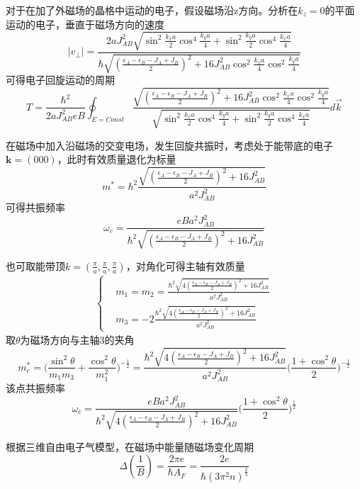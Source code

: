 \documentclass{article}
\begin{document}
对于在加了外磁场的晶格中运动的电子，假设磁场沿z方向。分析在$ k_z=0 $的平面运动的电子，垂直于磁场方向的速度
\begin{equation}
	|v_{\perp}|=\frac{2aJ_{AB}^2\sqrt{\sin^2\frac{k_xa}{2}\cos^4\frac{k_ya}{4}+\sin^2\frac{k_ya}{2}\cos^4\frac{k_xa}{4}}} {\hbar \sqrt{(\frac{\epsilon_A-\epsilon_B-J_A+J_B}{2})^2+16J_{AB}^2\cos^2\frac{k_xa}{4}\cos^2\frac{k_ya}{4}}}
\end{equation}
可得电子回旋运动的周期
\begin{equation}
	T=\frac{\hbar^2}{2aJ_{AB}^2eB}\oint_{E=Const}\dfrac{ \sqrt{(\frac{\epsilon_A-\epsilon_B-J_A+J_B}{2})^2+16J_{AB}^2\cos^2\frac{k_xa}{4}\cos^2\frac{k_ya}{4}}} {\sqrt{\sin^2\frac{k_xa}{2}\cos^4\frac{k_ya}{4}+\sin^2\frac{k_ya}{2}\cos^4\frac{k_xa}{4}}}d\vec{k}
\end{equation}


在磁场中加入沿磁场的交变电场，发生回旋共振时，考虑处于能带底的电子$ \boldsymbol{k}=(000) $，此时有效质量退化为标量
\begin{equation}
	m^*=\hbar^2\frac{\sqrt{(\frac{\epsilon_A-\epsilon_B-J_A+J_B}{2})^2+16J_{AB}^2}}{a^2J_{AB}^2}
\end{equation}
可得共振频率
\begin{equation}
	\omega_c=\frac{eBa^2J_{AB}^2}{\hbar^2\sqrt{(\frac{\epsilon_A-\epsilon_B-J_A+J_B}{2})^2+16J_{AB}^2}}
\end{equation}

也可取能带顶$ k=(\frac{\pi}{a},\frac{\pi}{a},\frac{\pi}{a}) $，对角化可得主轴有效质量
\begin{equation}
	\begin{aligned}
		\begin{cases}
			&m_1=m_2=\frac{\hbar^2\sqrt{4(\frac{\epsilon_A-\epsilon_B-J_A+J_B}{2})^2+16J_{AB}^2}}{a^2J_{AB}^2}\\
			&m_3=-2\frac{\hbar^2\sqrt{4(\frac{\epsilon_A-\epsilon_B-J_A+J_B}{2})^2+16J_{AB}^2}}{a^2J_{AB}^2}
		\end{cases}
	\end{aligned}
\end{equation}
取$\theta$为磁场方向与主轴3的夹角
\begin{equation}
	m_c^*=\big(\frac{\sin^2\theta}{m_1m_3}+\frac{\cos^2\theta}{m_1^2}\big)^{-\frac{1}{2}}=\frac{\hbar^2\sqrt{4(\frac{\epsilon_A-\epsilon_B-J_A+J_B}{2})^2+16J_{AB}^2}}{a^2J_{AB}^2} \big(\frac{1+\cos^2\theta}{2}\big)^{-\frac{1}{2}}
\end{equation}
该点共振频率
\begin{equation}
	\omega_c=\frac{eBa^2J_{AB}^2}{\hbar^2\sqrt{4(\frac{\epsilon_A-\epsilon_B-J_A+J_B}{2})^2+16J_{AB}^2}}\big(\frac{1+\cos^2\theta}{2}\big)^{\frac{1}{2}}
\end{equation}


根据三维自由电子气模型，在磁场中能量随磁场变化周期
\begin{equation}
	\Delta(\frac{1}{B})=\frac{2\pi e}{\hbar A_F}=\frac{2e}{\hbar(3\pi^2n)^{\frac{2}{3}}}
\end{equation}
\end{document}
